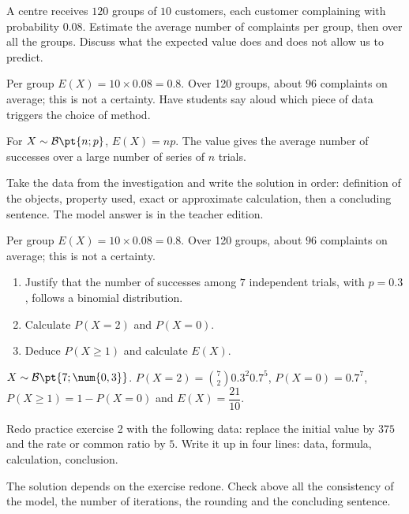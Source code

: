 \begin{activity}
A centre receives $120$ groups of $10$ customers, each customer complaining with probability $\num{0,08}$. Estimate the average number of complaints per group, then over all the groups. Discuss what the expected value does and does not allow us to predict.

\end{activity}
\begin{solution}Per group $E(X)=10\times\num{0,08}=\num{0,8}$. Over 120 groups, about $96$ complaints on average; this is not a certainty. Have students say aloud which piece of data triggers the choice of method.\end{solution}

\begin{summary}For $X\sim\mathcal B\pt{n;p}$, $E(X)=np$. The value gives the average number of successes over a large number of series of $n$ trials.\end{summary}

\begin{example}
Take the data from the investigation and write the solution in order: definition of the objects, property used, exact or approximate calculation, then a concluding sentence. The model answer is in the teacher edition.
\end{example}
\begin{solution}Per group $E(X)=10\times\num{0,08}=\num{0,8}$. Over 120 groups, about $96$ complaints on average; this is not a certainty.\end{solution}

\begin{exercise}[essential]
\begin{enumerate}\item Justify that the number of successes among $7$ independent trials, with $p=\num{0,3}$, follows a binomial distribution.\item Calculate $P(X=2)$ and $P(X=0)$.\item Deduce $P(X\geq1)$ and calculate $E(X)$.\end{enumerate}
\end{exercise}
\begin{solution}$X\sim\mathcal B\pt{7;\num{0,3}}$. $P(X=2)=\binom{7}2 \num{0,3}^2 \num{0,7}^{5}$, $P(X=0)=\num{0,7}^{7}$, $P(X\geq1)=1-P(X=0)$ and $E(X)=\dfrac{21}{10}$.\end{solution}


\begin{homework}Redo practice exercise 2 with the following data: replace the initial value by $375$ and the rate or common ratio by $5$. Write it up in four lines: data, formula, calculation, conclusion.\end{homework}
\begin{solution}The solution depends on the exercise redone. Check above all the consistency of the model, the number of iterations, the rounding and the concluding sentence.\end{solution}

